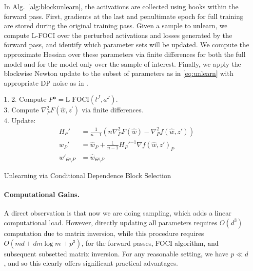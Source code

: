 In Alg.~\ref{alg:blockunlearn}, the activations are collected using hooks within the forward pass. 
First, gradients at the last and penultimate epoch for full training are stored during the original training pass. Given a sample to unlearn, we compute L-FOCI over the perturbed activations and losses generated by the forward pass, and identify which parameter sets will be updated. We compute the approximate Hessian over these parameters via finite differences for both the full model and for the model only over the sample of interest. Finally, we apply the blockwise Newton update to the subset of parameters as in \eqref{eq:unlearn} with appropriate DP noise as in \cite{sekhari2021remember}.
\begin{algorithm}
\SetAlgoLined
{}
1. 
2. Compute $P* = \mbox{L-FOCI}(l^J, a^J)$. \\
3. Compute $\nabla^2_{P} F(\hat{w}, z^\prime)$ via finite differences. \\
4. Update:
\begin{align}
    H_P' &= \frac{1}{n-1}\left(n \nabla^2_{P} F(\hat{w}) - \nabla^2_{P} f(\hat{w}, z')\right) \\
    w_{P}' &= \hat{w}_{P} + \frac{1}{n-1}H_{P}'^{-1} \nabla f(\hat{w}, z')_{P} \\
    w'_{\Theta\setminus P} &= \hat{w}_{\Theta\setminus P}
\end{align}
 \caption{\label{alg:blockunlearn} Unlearning via Conditional Dependence Block Selection}
\end{algorithm}

\paragraph{Computational Gains.}
A direct observation is that now we are doing sampling, which adds a linear computational load.
However, directly updating all parameters requires $O(d^3)$ computation due to matrix inversion, while this procedure requires $O(md + dm\log m + p^3)$, for the forward passes, FOCI algorithm, and subsequent subsetted matrix inversion. For any reasonable setting, we have $p \ll d$, and so this clearly offers significant practical advantages.








